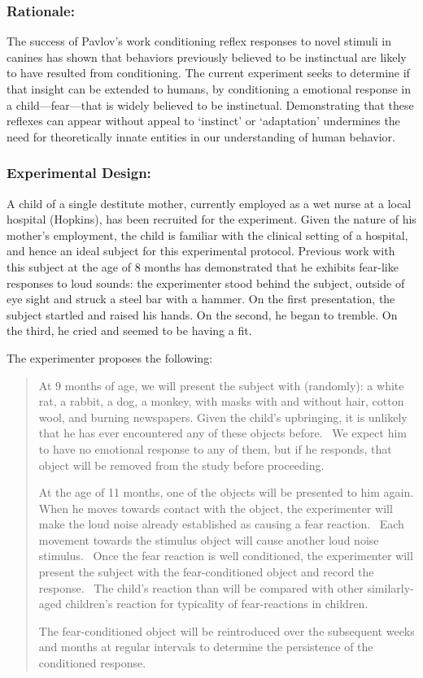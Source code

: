 \subsubsection{Rationale:}
\label{rationale:}

The success of Pavlov's work conditioning reflex responses to novel stimuli in canines has shown that behaviors previously believed to be instinctual are likely to have resulted from conditioning. The current experiment seeks to determine if that insight can be extended to humans, by conditioning a emotional response in a child---fear---that is widely believed to be instinctual. Demonstrating that these reflexes can appear without appeal to `instinct' or `adaptation' undermines the need for theoretically innate entities in our understanding of human behavior.

\subsubsection{Experimental Design:}
\label{experimentaldesign:}

A child of a single destitute mother, currently employed as a wet nurse at a local hospital (Hopkins), has been recruited for the experiment. Given the nature of his mother's employment, the child is familiar with the clinical setting of a hospital, and hence an ideal subject for this experimental protocol. Previous work with this subject at the age of 8 months has demonstrated that he exhibits fear-like responses to loud sounds: the experimenter stood behind the subject, outside of eye sight and struck a steel bar with a hammer. On the first presentation, the subject startled and raised his hands. On the second, he began to tremble. On the third, he cried and seemed to be having a fit.

The experimenter proposes the following:

\begin{quote}

At 9 months of age, we will present the subject with (randomly): a white rat, a rabbit, a dog, a monkey, with masks with and without hair, cotton wool, and burning newspapers. Given the child's upbringing, it is unlikely that he has ever encountered any of these objects before.  We expect him to have no emotional response to any of them, but if he responds, that object will be removed from the study before proceeding.

At the age of 11 months, one of the objects will be presented to him again. When he moves towards contact with the object, the experimenter will make the loud noise already established as causing a fear reaction.  Each movement towards the stimulus object will cause another loud noise stimulus.  Once the fear reaction is well conditioned, the experimenter will present the subject with the fear-conditioned object and record the response.  The child's reaction than will be compared with other similarly-aged children's reaction for typicality of fear-reactions in children.

The fear-conditioned object will be reintroduced over the subsequent weeks and months at regular intervals to determine the persistence of the conditioned response. 
\end{quote}

